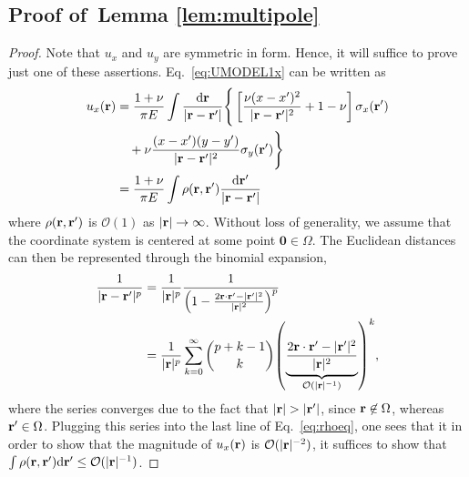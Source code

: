 \documentclass[aps,prl,reprint,twocolumn,groupedaddress,showpacs]{revtex4-1}
\def\dd{\mbox{d}}
\def\r{{\bf r}}
\begin{document}
\subsection{Proof of~Lemma \ref{lem:multipole}}

\begin{proof}
Note that $u_x$ and $u_y$ are symmetric in form. Hence, it will suffice to prove just one of these assertions. Eq.~\ref{eq:UMODEL1x} can be written as
\begin{align}
u_x(\r) &= \frac{1+\nu}{\pi E} \int \frac{\dd \r}{|\r-\r'|} \Bigg\{ \left[ \frac{\nu(x - x')^2}{|\r-\r'|^2} + 1-\nu \right]\sigma_{x}(\r')  \nonumber\\
&\quad+\nu\frac{(x-x')(y-y')}{|\r-\r'|^2} \sigma_y(\r')  \Bigg\} \nonumber\\
&= \frac{1+\nu}{\pi E}   \int \rho(\r,\r')    \frac{\dd \r'}{|\r-\r'|} \label{eq:rhoeq}
\end{align}
where $\rho(\r,\r')$ is $\mathcal{O}(1)$ as $\vert\r\vert\to\infty$. Without loss of generality, we assume that the coordinate system is centered at some point $\mathbf{0}\in\Omega$. The Euclidean distances can then be represented through the binomial expansion,
\begin{align}
\frac{1}{|\r-\r'|^p} &= \frac{1}{|\r|^p}\frac{1}{\left(1 - \frac{2\r\cdot\r' - |\r'|^2}{|\r|^2} \right)^p } \nonumber\\
&= \frac{1}{|\r|^p}\sum_{k=0}^\infty {{p+k-1}\choose{k}} 
{\left( \underbrace{ \frac{2\r\cdot\r' - |\r'|^2}{|\r|^2}}_{\mathcal{O}(|\r|^{-1})} \right)}^k,
\end{align} 
where the series converges due to the fact that $|\r| > |\r'|$, since $\r\not\in\Omega$, whereas $\r'\in\Omega$. Plugging this series into the last line of Eq.~\ref{eq:rhoeq}, one sees that it in order to show that the magnitude of $u_x(\r)$ is $\mathcal{O}(|\r|^{-2})$, it suffices to show that $\int \rho(\r,\r')\dd\r' \leq \mathcal{O}(|\r|^{-1})$.


\end{proof}
\end{document}
